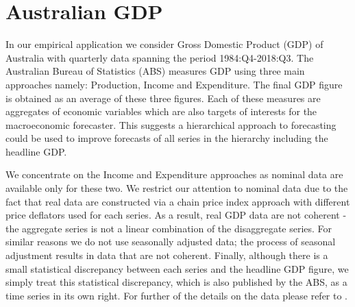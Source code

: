 \documentclass[graybox]{svmult}
\begin{document}

\section{Australian GDP}\label{sec:data}

In our empirical application we consider Gross Domestic Product (GDP) of Australia with quarterly data spanning the period 1984:Q4-2018:Q3. The Australian Bureau of Statistics (ABS) measures GDP using three main approaches namely: Production, Income and Expenditure. The final GDP figure is obtained as an average of these three figures. Each of these measures are aggregates of economic variables which are also targets of interests for the macroeconomic forecaster. This suggests a hierarchical approach to forecasting could be used to improve forecasts of all series in the hierarchy including the headline GDP.

We concentrate on the Income and Expenditure approaches as nominal data are available only for these two. We restrict our attention to nominal data due to the fact that real data are constructed via a chain price index approach with different price deflators used for each series. As a result, real GDP data are not coherent - the aggregate series is not a linear combination of the disaggregate series.  For similar reasons we do not use seasonally adjusted data; the process of seasonal adjustment results in data that are not coherent.  Finally, although there is a small statistical discrepancy between each series and the headline GDP figure, we simply treat this statistical discrepancy, which is also published by the ABS, as a time series in its own right. For further of the details on the data please refer to \cite{ABS2018}.
\end{document}
